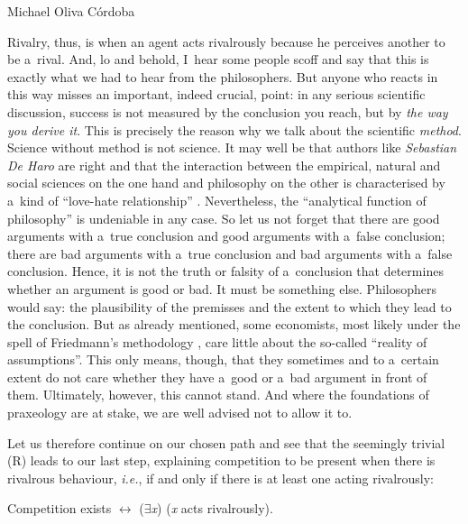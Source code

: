 \begin{artengenv}{Michael Oliva Córdoba}
%
%
%
%

\noindent Rivalry, thus, is when an agent acts rivalrously because he perceives another to be a~rival. And, lo and behold, I~hear some people scoff and say that this is exactly what we had to hear from the philosophers. But anyone who reacts in this way misses an important, indeed crucial, point: in any serious scientific discussion, success is not measured by the conclusion you reach, but by \textit{the way you derive it}. This is precisely the reason why we talk about the scientific \textit{method}. Science without method is not science. It may well be that authors like \textit{Sebastian De Haro} are right and that the interaction between the empirical, natural and social sciences on the one hand and philosophy on the other is characterised by a~kind of ``love-hate relationship'' 
\parencite[][]{de_haro_science_2020}. %
 Nevertheless, the ``analytical function of philosophy'' 
\parencite[][p.304f.]{de_haro_science_2020} %
 is undeniable in any case. So let us not forget that there are good arguments with a~true conclusion and good arguments with a~false conclusion; there are bad arguments with a~true conclusion and bad arguments with a~false conclusion. Hence, it is not the truth or falsity of a~conclusion that determines whether an argument is good or bad. It must be something else. Philosophers would say: the plausibility of the premisses and the extent to which they lead to the conclusion. But as already mentioned, some economists, most likely under the spell of Friedmann's methodology 
\parencite[][14f.]{friedman_methodology_1966}, %
care little about the so-called ``reality of assumptions''. This only means, though, that they sometimes and to a~certain extent do not care whether they have a~good or a~bad argument in front of them. Ultimately, however, this cannot stand. And where the foundations of praxeology are at stake, we are well advised not to allow it to.



Let us therefore continue on our chosen path and see that the seemingly trivial (R) leads to our last step, explaining competition to be present when there is rivalrous behaviour, \textit{i.e.}, if and only if there is at least one acting rivalrously:
\vspace{-.09cm}
\begin{description}[font=\normalfont, labelindent=0pt, leftmargin=!, labelwidth=1cm]
  \item[(C)]  Competition exists $\leftrightarrow$ (${\exists}$\textit{x}) (\textit{x} acts rivalrously).
\end{description}
\vspace{-.09cm}



\end{artengenv}
